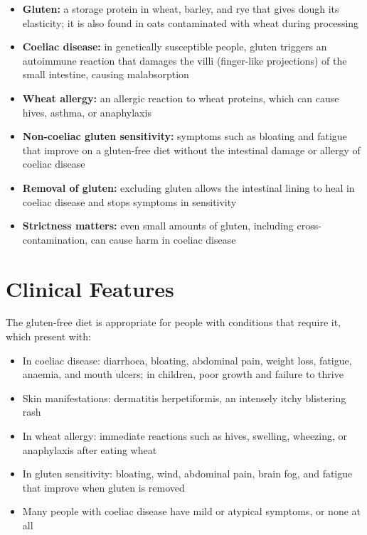 \begin{itemize}
    \item \textbf{Gluten:} a storage protein in wheat, barley, and rye that gives dough its elasticity; it is also found in oats contaminated with wheat during processing
    \item \textbf{Coeliac disease:} in genetically susceptible people, gluten triggers an autoimmune reaction that damages the villi (finger-like projections) of the small intestine, causing malabsorption
    \item \textbf{Wheat allergy:} an allergic reaction to wheat proteins, which can cause hives, asthma, or anaphylaxis
    \item \textbf{Non-coeliac gluten sensitivity:} symptoms such as bloating and fatigue that improve on a gluten-free diet without the intestinal damage or allergy of coeliac disease
    \item \textbf{Removal of gluten:} excluding gluten allows the intestinal lining to heal in coeliac disease and stops symptoms in sensitivity
    \item \textbf{Strictness matters:} even small amounts of gluten, including cross-contamination, can cause harm in coeliac disease
\end{itemize}

\section*{Clinical Features}
The gluten-free diet is appropriate for people with conditions that require it, which present with:

\begin{itemize}
    \item In coeliac disease: diarrhoea, bloating, abdominal pain, weight loss, fatigue, anaemia, and mouth ulcers; in children, poor growth and failure to thrive
    \item Skin manifestations: dermatitis herpetiformis, an intensely itchy blistering rash
    \item In wheat allergy: immediate reactions such as hives, swelling, wheezing, or anaphylaxis after eating wheat
    \item In gluten sensitivity: bloating, wind, abdominal pain, brain fog, and fatigue that improve when gluten is removed
    \item Many people with coeliac disease have mild or atypical symptoms, or none at all
\end{itemize}

